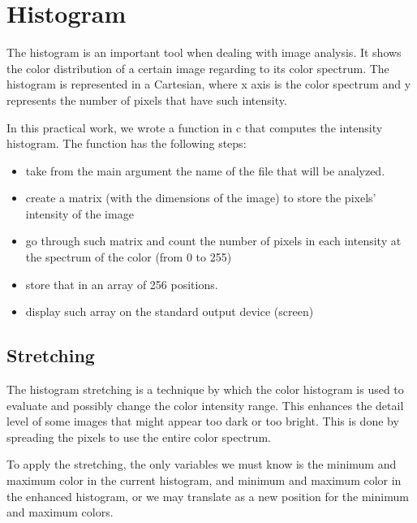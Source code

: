 \documentclass{article}
\begin{document}
\section{Histogram}

	The histogram is an important tool when dealing with image analysis. It shows the color distribution of a certain image regarding to its color spectrum. The 		histogram is represented in a Cartesian, where x axis is the color spectrum and y represents the number of pixels that have such intensity.

	In this practical work, we wrote a function in c that computes the intensity histogram. The function has the following steps:
	\begin{itemize}
  		\item take from the main argument the name of the file that will be analyzed.
  		\item create a matrix (with the dimensions of the image) to store the pixels' intensity of the image
  		\item go through such matrix and count the number of pixels in each intensity at the spectrum of the color (from 0 to 255)
  		\item store that in an array of 256 positions.
  		\item display such array on the standard output device (screen)
	\end{itemize}

	\subsection{Stretching}

	The histogram stretching is a technique by which the color histogram is used to evaluate and possibly change the color intensity range. This enhances the 		detail level of some images that might appear too dark or too bright. This is done by spreading the pixels to use the entire color spectrum.
	
	To apply the stretching, the only variables we must know is the minimum and maximum color in the current histogram, and minimum and maximum color in the 		enhanced histogram, or we may translate as a new position for the minimum and maximum colors. 
\end{document}
